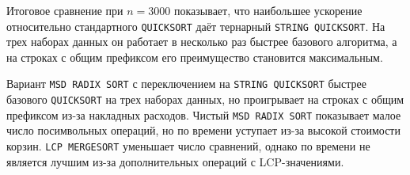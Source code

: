 \documentclass[a4paper,12pt]{extarticle}
\begin{document}
Итоговое сравнение при $n = 3000$ показывает, что наибольшее ускорение относительно стандартного \texttt{QUICKSORT} даёт тернарный \texttt{STRING QUICKSORT}. На трех наборах данных он работает в несколько раз быстрее базового алгоритма, а на строках с общим префиксом его преимущество становится максимальным.

Вариант \texttt{MSD RADIX SORT} с переключением на \texttt{STRING QUICKSORT} быстрее базового \texttt{QUICKSORT} на трех наборах данных, но проигрывает на строках с общим префиксом из-за накладных расходов. Чистый \texttt{MSD RADIX SORT} показывает малое число посимвольных операций, но по времени уступает из-за высокой стоимости корзин. \texttt{LCP MERGESORT} уменьшает число сравнений, однако по времени не является лучшим из-за дополнительных операций с LCP-значениями.
\end{document}
